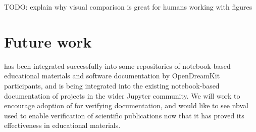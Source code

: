 \documentclass{deliverablereport}
\begin{document}
TODO: explain why visual comparison is great for humans working with figures

\section{Future work} %

\nbval has been integrated successfully into some repositories of
notebook-based educational materials and software documentation by
OpenDreamKit participants, and is being integrated into the existing
notebook-based documentation of projects in the wider Jupyter
community.  We will work to encourage adoption of \nbval for verifying
documentation, and would like to see nbval used to enable verification
of scientific publications now that it has proved its effectiveness in
educational materials.

\printbibliography
\end{document}
